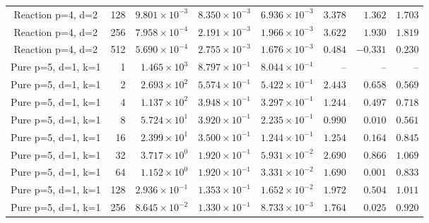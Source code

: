 \begin{longtable}{@{}crrrrrrr@{}}
Reaction p=4, d=2 & 128 & $9.801\!\times\!10^{-3}$ & $8.350\!\times\!10^{-3}$ & $6.936\!\times\!10^{-3}$ & $3.378$ & $1.362$ & $1.703$ \\
Reaction p=4, d=2 & 256 & $7.958\!\times\!10^{-4}$ & $2.191\!\times\!10^{-3}$ & $1.966\!\times\!10^{-3}$ & $3.622$ & $1.930$ & $1.819$ \\
Reaction p=4, d=2 & 512 & $5.690\!\times\!10^{-4}$ & $2.755\!\times\!10^{-3}$ & $1.676\!\times\!10^{-3}$ & $0.484$ & $-0.331$ & $0.230$ \\
Pure p=5, d=1, k=1 & 1 & $1.465\!\times\!10^{3}$ & $8.797\!\times\!10^{-1}$ & $8.044\!\times\!10^{-1}$ & -- & -- & -- \\
Pure p=5, d=1, k=1 & 2 & $2.693\!\times\!10^{2}$ & $5.574\!\times\!10^{-1}$ & $5.422\!\times\!10^{-1}$ & $2.443$ & $0.658$ & $0.569$ \\
Pure p=5, d=1, k=1 & 4 & $1.137\!\times\!10^{2}$ & $3.948\!\times\!10^{-1}$ & $3.297\!\times\!10^{-1}$ & $1.244$ & $0.497$ & $0.718$ \\
Pure p=5, d=1, k=1 & 8 & $5.724\!\times\!10^{1}$ & $3.920\!\times\!10^{-1}$ & $2.235\!\times\!10^{-1}$ & $0.990$ & $0.010$ & $0.561$ \\
Pure p=5, d=1, k=1 & 16 & $2.399\!\times\!10^{1}$ & $3.500\!\times\!10^{-1}$ & $1.244\!\times\!10^{-1}$ & $1.254$ & $0.164$ & $0.845$ \\
Pure p=5, d=1, k=1 & 32 & $3.717\!\times\!10^{0}$ & $1.920\!\times\!10^{-1}$ & $5.931\!\times\!10^{-2}$ & $2.690$ & $0.866$ & $1.069$ \\
Pure p=5, d=1, k=1 & 64 & $1.152\!\times\!10^{0}$ & $1.920\!\times\!10^{-1}$ & $3.331\!\times\!10^{-2}$ & $1.690$ & $0.001$ & $0.833$ \\
Pure p=5, d=1, k=1 & 128 & $2.936\!\times\!10^{-1}$ & $1.353\!\times\!10^{-1}$ & $1.652\!\times\!10^{-2}$ & $1.972$ & $0.504$ & $1.011$ \\
Pure p=5, d=1, k=1 & 256 & $8.645\!\times\!10^{-2}$ & $1.330\!\times\!10^{-1}$ & $8.733\!\times\!10^{-3}$ & $1.764$ & $0.025$ & $0.920$ \\
\bottomrule
\end{longtable}
